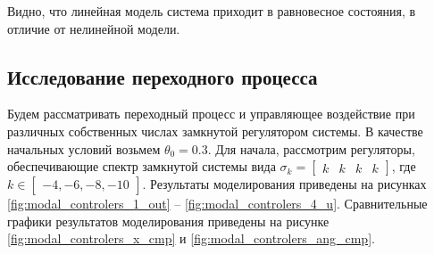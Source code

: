\FloatBarrier
Видно, что линейная модель система приходит в равновесное состояния, в отличие от нелинейной модели.

\subsection{Исследование переходного процесса}
Будем рассматривать переходный процесс и управляющее воздействие при различных собственных числах замкнутой регулятором системы. 
В качестве начальных условий возьмем $\theta_0 = 0.3$. Для начала, рассмотрим регуляторы, обеспечивающие спектр 
замкнутой системы вида $\sigma_k = \begin{bmatrix}k & k & k & k\end{bmatrix}$, где $k \in \begin{bmatrix}-4, -6, -8, -10\end{bmatrix}$. 
Результаты моделирования приведены на рисунках \ref{fig:modal_controlers_1_out} -- \ref{fig:modal_controlers_4_u}.
Сравнительные графики результатов моделирования приведены на рисунке \ref{fig:modal_controlers_x_cmp} и \ref{fig:modal_controlers_ang_cmp}.

